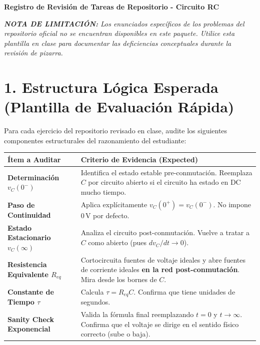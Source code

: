 \documentclass[11pt, a4paper]{article}
\begin{document}
\begin{tcolorbox}[colback=ucbblue!5!white, colframe=ucbblue, title=\textbf{Herramienta Docente: Clave de Revisión Diagnóstica de Tareas (EC3)}]
    \centering \textbf{Registro de Revisión de Tareas de Repositorio - Circuito RC}
\end{tcolorbox}

\noindent\textit{\textbf{NOTA DE LIMITACIÓN:} Los enunciados específicos de los problemas del repositorio oficial no se encuentran disponibles en este paquete. Utilice esta plantilla en clase para documentar las deficiencias conceptuales durante la revisión de pizarra.}

\vspace{0.4cm}
\section*{1. Estructura Lógica Esperada (Plantilla de Evaluación Rápida)}
Para cada ejercicio del repositorio revisado en clase, audite los siguientes componentes estructurales del razonamiento del estudiante:

\vspace{0.2cm}
\renewcommand{\arraystretch}{1.5}
\begin{tabularx}{\textwidth}{>{\bfseries\RaggedRight}p{4cm} >{\RaggedRight\arraybackslash}X}
\toprule
\textbf{Ítem a Auditar} & \textbf{Criterio de Evidencia (Expected)} \\ 
\midrule
Determinación $v_C(0^-)$ & Identifica el estado estable pre-conmutación. Reemplaza $C$ por circuito abierto si el circuito ha estado en DC mucho tiempo. \\ \addlinespace
Paso de Continuidad & Aplica explícitamente $v_C(0^+) = v_C(0^-)$. No impone $0\,\text{V}$ por defecto. \\ \addlinespace
Estado Estacionario $v_C(\infty)$ & Analiza el circuito post-conmutación. Vuelve a tratar a $C$ como abierto (pues $dv_C/dt \to 0$). \\ \addlinespace
Resistencia Equivalente $R_{eq}$ & Cortocircuita fuentes de voltaje ideales y abre fuentes de corriente ideales \textbf{en la red post-conmutación}. Mira desde los bornes de $C$. \\ \addlinespace
Constante de Tiempo $\tau$ & Calcula $\tau = R_{eq}C$. Confirma que tiene unidades de segundos. \\ \addlinespace
Sanity Check Exponencial & Valida la fórmula final reemplazando $t=0$ y $t \to \infty$. Confirma que el voltaje se dirige en el sentido físico correcto (sube o baja). \\ 
\bottomrule
\end{tabularx}
\end{document}
